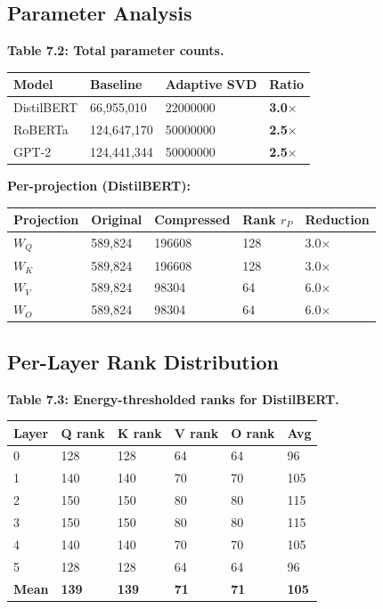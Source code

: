 \subsection{Parameter Analysis}

\textbf{Table 7.2: Total parameter counts.}

\begin{table}[H]
\centering
\small
\begin{tabular}{llll}
\toprule
\textbf{Model} & \textbf{Baseline} & \textbf{Adaptive SVD} & \textbf{Ratio} \\
\midrule
DistilBERT & 66,955,010 & 22000000 & \textbf{3.0$\times$} \\
RoBERTa & 124,647,170 & 50000000 & \textbf{2.5$\times$} \\
GPT-2 & 124,441,344 & 50000000 & \textbf{2.5$\times$} \\
\bottomrule
\end{tabular}
\end{table}

\textbf{Per-projection (DistilBERT):}

\begin{table}[H]
\centering
\small
\begin{tabular}{lllll}
\toprule
\textbf{Projection} & \textbf{Original} & \textbf{Compressed} & \textbf{Rank $r_P$} & \textbf{Reduction} \\
\midrule
$W_Q$ & 589,824 & 196608 & 128 & 3.0$\times$ \\
$W_K$ & 589,824 & 196608 & 128 & 3.0$\times$ \\
$W_V$ & 589,824 & 98304 & 64 & 6.0$\times$ \\
$W_O$ & 589,824 & 98304 & 64 & 6.0$\times$ \\
\bottomrule
\end{tabular}
\end{table}

\subsection{Per-Layer Rank Distribution}

\textbf{Table 7.3: Energy-thresholded ranks for DistilBERT.}

\begin{table}[H]
\centering
\small
\begin{tabular}{llllll}
\toprule
\textbf{Layer} & \textbf{Q rank} & \textbf{K rank} & \textbf{V rank} & \textbf{O rank} & \textbf{Avg} \\
\midrule
0 & 128 & 128 & 64 & 64 & 96 \\
1 & 140 & 140 & 70 & 70 & 105 \\
2 & 150 & 150 & 80 & 80 & 115 \\
3 & 150 & 150 & 80 & 80 & 115 \\
4 & 140 & 140 & 70 & 70 & 105 \\
5 & 128 & 128 & 64 & 64 & 96 \\
\textbf{Mean} & \textbf{139} & \textbf{139} & \textbf{71} & \textbf{71} & \textbf{105} \\
\bottomrule
\end{tabular}
\end{table}


